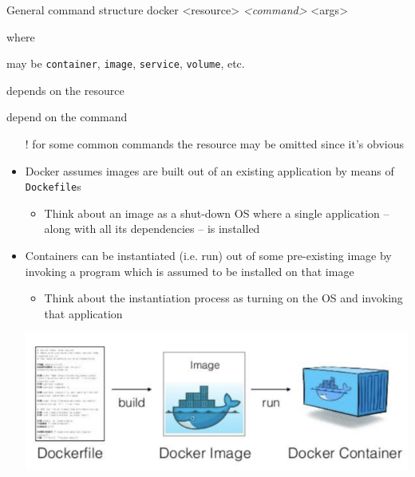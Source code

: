 \documentclass[presentation]{beamer}\mode<presentation>{\usetheme{AMSBolognaFC}}
\begin{document}
\begin{frame}[allowframebreaks]
\begin{block}{General command structure}
        docker \alert{<resource>} \textit{<command>} <args>
    \end{block}
    where
    \begin{description}\small
        \item[\texttt{resource}] may be \texttt{container}, \texttt{image}, \texttt{service}, \texttt{volume}, etc.
        \item[\texttt{command}] depends on the resource
        \item[\texttt{args}] depend on the command
    \end{description}
    \begin{itemize}\small
        \item[!] for some common commands the resource may be omitted since it's obvious
    \end{itemize}

    \framebreak

    \begin{itemize}

        \item Docker assumes images are \alert{built} out of an existing application by means of \alert{\texttt{Dockefile}s}

        \begin{itemize}
            \item Think about an image as a shut-down OS where a single application -- along with all its dependencies -- is installed
        \end{itemize}

        \smallskip

        \item Containers can be instantiated (i.e. \alert{run}) out of some pre-existing image by invoking a program which is assumed to be installed on that image

        \begin{itemize}
            \item Think about the instantiation process as turning on the OS and invoking that application
        \end{itemize}

        \smallskip

        \begin{center}
            \includegraphics[width=.5\linewidth]{figures/build-run-workflow.png}
        \end{center}


\end{itemize}
\end{frame}
\end{document}

